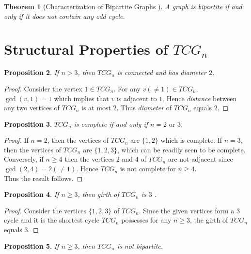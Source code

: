 \documentclass[12pt]{article}
\newtheorem{theorem}{Theorem}[section]
\newtheorem{proposition}[theorem]{Proposition}
\begin{document}
	\begin{theorem}[Characterization of Bipartite Graphs {\cite[Theorem~1.2.18]{west2001introduction}}] \label{CY}
		A graph is bipartite if and only if it does not contain any odd cycle.
	\end{theorem}
	
	
	
	\section{Structural Properties of $TCG_n$}
	\label{S1}
	\begin{proposition}
		If $n>3$, then	$TCG_n$ is connected and has diameter $2$.
	\end{proposition}
	\begin{proof}
		Consider the vertex $1\in TCG_n$.
		For any $v(\neq 1)\in TCG_n$, $\gcd(v,1)=1$ which implies that $v$ is adjacent to $1$.
		Hence \textit{distance} between any two vertices of $TCG_n$ is at most $2$.
		Thus \textit{diameter} of $TCG_n$ equals $2$.
	\end{proof}
	
	
	\begin{proposition}
		$TCG_n$ is complete if and only if $n=2 \text{ or } 3$.
	\end{proposition}
	
	
	
	\begin{proof}
		If $n=2$,  then the vertices of $TCG_n$ are $\{1,2\}$ which is complete. If $n=3$, then the vertices of $TCG_n$ are $\{1,2,3\}$, which can be readily seen to be complete.
		Conversely, if $n\ge 4$ then the vertices $2$ and $4$ of $TCG_n$ are not adjacent since $\gcd(2,4)=2(\neq 1)$.
		Hence $TCG_n$ is not complete for $n\ge 4$.
		\\
		Thus the result follows.
	\end{proof}
	
	\begin{proposition}
		If $n\ge 3$, then girth of $TCG_n$ is $3$ .
	\end{proposition}
	
	\begin{proof}
		Consider the vertices $\{1,2,3\}$ of $TCG_n$.
		Since the given vertices form a $3$ cycle and it is the shortest cycle $TCG_n$ possesses for any $n\ge 3$, the girth of  $TCG_n$ equals $3$. 
	\end{proof}
	
	\begin{proposition}
		If $n\ge 3$, then $TCG_n$ is not bipartite.
	\end{proposition}
	
\end{document}
